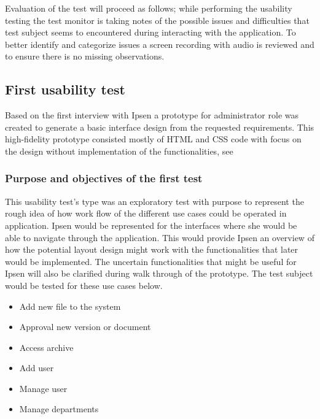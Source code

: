 Evaluation of the test will proceed as follows; while performing the usability testing the test monitor is taking notes of the possible issues and difficulties that test subject seems to encountered during interacting with the application. 
To better identify and categorize issues a screen recording with audio is reviewed and to ensure there is no missing observations.

\subsection{First usability test}\label{firsttest}
Based on the first interview with Ipsen a prototype for administrator role was created to generate a basic interface design from the requested requirements. 
This high-fidelity prototype consisted mostly of HTML and CSS code with focus on the design without implementation of the functionalities,  see %

\subsubsection*{Purpose and objectives of the first test}
This usability test's type was an exploratory test with purpose to represent the rough idea of how work flow of the different use cases could be operated in application. 
Ipsen would be represented for the interfaces where she would be able to navigate through the application.
This would provide Ipsen an overview of how the potential layout design might work with the functionalities that later would be implemented. 
The uncertain functionalities that might be useful for Ipsen will also be clarified during walk through of the prototype.
The test subject would be tested for these use cases below.

\begin{itemize}
	\item Add new file to the system
	\item Approval new version or document
	\item Access archive
	\item Add user
	\item Manage user
	\item Manage departments
\end{itemize}

